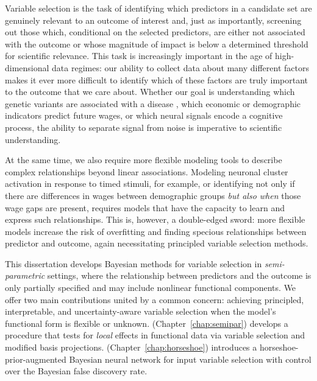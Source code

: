 Variable selection is the task of identifying which predictors in a
candidate set are genuinely relevant to an outcome of interest and,
just as importantly, screening out those which, conditional on the
selected predictors, are either not associated with the outcome or
whose magnitude of impact is below a determined threshold for
scientific relevance. This task is increasingly important in the age
of high-dimensional data regimes: our ability to collect data about
many different factors makes it ever more difficult to identify which
of these factors are truly important to the outcome that we care
about. Whether our goal is understanding which genetic variants are
associated with a disease \citep{tibshirani_regression_1996}, which
economic or demographic indicators predict future wages, or which
neural signals encode a cognitive process, the ability to separate
signal from noise is imperative to scientific understanding.

At the same time, we also require more flexible modeling tools to
describe complex relationships beyond linear associations. Modeling
neuronal cluster activation in response to timed stimuli, for
example, or identifying not only if there are differences in wages
between demographic groups \textit{but also when} those wage gaps
are present, requires models that have the capacity to learn and
express such relationships. This is, however, a double-edged sword:
more flexible models increase the risk of overfitting and finding
specious relationships between predictor and outcome, again
necessitating principled variable selection methods.

This dissertation develops Bayesian methods for variable selection in
\emph{semi-parametric} settings, where the relationship between
predictors and the outcome is only partially specified and may
include nonlinear functional components. We offer two main
contributions united by a common concern:
achieving principled, interpretable, and uncertainty-aware variable
selection when the model's functional form is flexible or unknown. 
(Chapter~\ref{chap:semipar}) develops a procedure that tests for \textit{local} effects in
functional data via variable selection and modified basis projections.   
(Chapter~\ref{chap:horseshoe}) introduces a horseshoe-prior-augmented
Bayesian neural network for input variable selection with control over 
the Bayesian false discovery rate.

